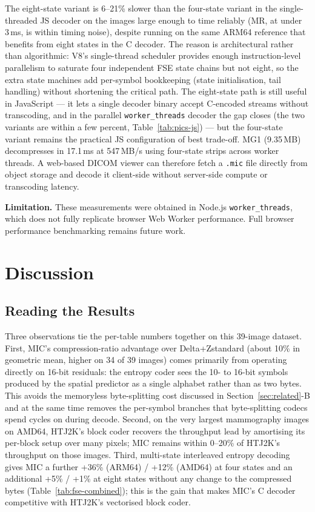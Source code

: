 \documentclass[journal]{IEEEtran}
\begin{document}
The eight-state variant is 6--21\% slower than the four-state variant in
the single-threaded JS decoder on the images large enough to time
reliably (MR, at under 3\,ms, is within timing noise), despite running on
the same ARM64 reference that benefits from eight states in the C decoder.
The reason is architectural rather than algorithmic: V8's single-thread
scheduler provides enough instruction-level parallelism to saturate four
independent FSE state chains but not eight, so the extra state machines
add per-symbol bookkeeping (state initialisation, tail handling) without
shortening the critical path. The eight-state path is still useful in
JavaScript --- it lets a single decoder binary accept C-encoded streams
without transcoding, and in the parallel \texttt{worker\_threads} decoder
the gap closes (the two variants are within a few percent, Table~\ref{tab:pics-js})
--- but the four-state variant remains the practical JS configuration of
best trade-off. MG1 (9.35\,MB) decompresses in 17.1\,ms at 547\,MB/s using
four-state strips across worker threads. A web-based DICOM viewer can
therefore fetch a \texttt{.mic} file directly from object storage and
decode it client-side without server-side compute or transcoding latency.

\textbf{Limitation.} These measurements were obtained in Node.js
\texttt{worker\_threads}, which does not fully replicate browser Web Worker
performance. Full browser performance benchmarking remains future work.

\section{Discussion}
\label{sec:discussion}

\subsection{Reading the Results}

Three observations tie the per-table numbers together on this 39-image
dataset. First, MIC's compression-ratio advantage over Delta+Zstandard
(about 10\% in geometric mean, higher on 34 of 39 images) comes primarily
from operating directly
on 16-bit residuals: the entropy coder sees the 10- to 16-bit symbols
produced by the spatial predictor as a single alphabet rather than as
two bytes. This avoids the memoryless byte-splitting cost discussed in
Section~\ref{sec:related}-B and at the same time removes the per-symbol
branches that byte-splitting codecs spend cycles on during decode.
Second, on the very largest mammography images on AMD64, HTJ2K's block
coder recovers the throughput lead by amortising its per-block setup
over many pixels; MIC remains within 0--20\% of HTJ2K's throughput on
those images. Third, multi-state interleaved entropy decoding gives MIC
a further +36\% (ARM64) / +12\% (AMD64) at four states and an additional
+5\% / +1\% at eight states without any change to the compressed bytes
(Table~\ref{tab:fse-combined}); this is the gain that makes MIC's C
decoder competitive with HTJ2K's vectorised block coder.
\end{document}
